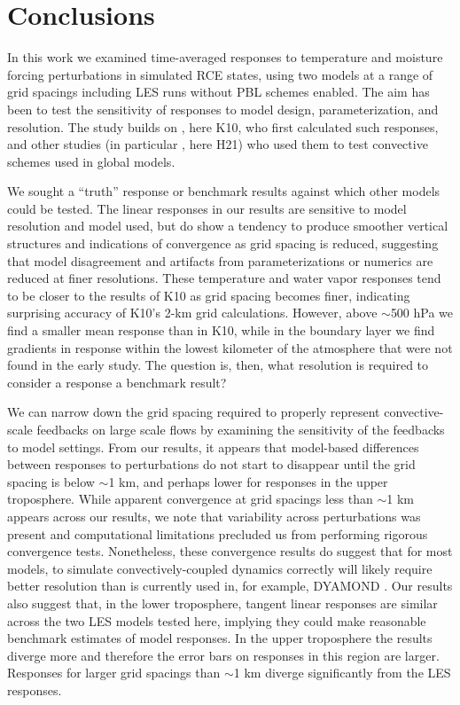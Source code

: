 \documentclass[draft]{agujournal2019}
\begin{document}
\section{Conclusions}
\label{sec:conclusions}

In this work we examined time-averaged responses to temperature and moisture
forcing perturbations in simulated RCE states, using two models at a range of
grid spacings including LES runs without PBL schemes enabled. The aim has been
to test the sensitivity of responses to model design, parameterization, and resolution.
The study builds on , here K10, who first calculated such
responses, and other studies (in particular , here H21)
who used them to test convective schemes used in global models.

We sought a ``truth'' response or benchmark results against which other models
could be tested. The linear responses in our results are sensitive to model
resolution and model used, but do show a tendency to produce smoother vertical
structures and indications of convergence as grid spacing is reduced, suggesting
that model disagreement and artifacts from parameterizations or numerics are
reduced at finer resolutions. These temperature and water vapor responses tend to
be closer to the results of K10 as grid spacing becomes finer, indicating
surprising accuracy of K10's 2-km grid calculations. However, above
$\sim$500 hPa we find a smaller mean response than in K10, while in the boundary
layer we find gradients in response within the lowest kilometer of the
atmosphere that were not found in the early study. The question is, then, what
resolution is required to consider a response a benchmark result?

We can narrow down the grid spacing required to properly represent
convective-scale feedbacks on large scale flows by examining the sensitivity of
the feedbacks to model settings. From our results, it appears that model-based
differences between responses to perturbations do not start to disappear until
the grid spacing is below $\sim$1 km, and perhaps lower for responses in the
upper troposphere. While apparent convergence at grid spacings less than $\sim$1
km appears across our results, we note that variability across perturbations was
present and computational limitations precluded us from performing rigorous
convergence tests. Nonetheless, these convergence results do suggest that for
most models, to simulate convectively-coupled dynamics correctly will likely
require better resolution than is currently used in, for example, DYAMOND
\cite{Stevens_PEPS_2019}. Our results also suggest that, in the lower
troposphere, tangent linear responses are similar across the two LES models
tested here, implying they could make reasonable benchmark estimates of model
responses. In the upper troposphere the results diverge more and therefore the
error bars on responses in this region are larger. Responses for larger grid
spacings than $\sim$1 km diverge significantly from the LES responses.
\end{document}
